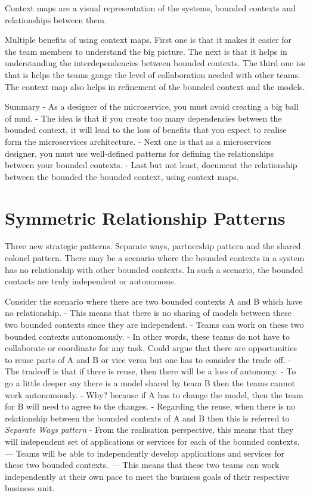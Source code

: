 Context maps are a visual representation of the systems, bounded contexts and relationships between them.

Multiple benefits of using context maps.
First one is that it makes it easier for the team members to understand the big picture.
The next is that it helps in understanding the interdependencies between bounded contexts.
The third one iss that is helps the teams gauge the level of collaboration needed with other teams.
The context map also helps in refinement of the bounded context and the models.

Summary
- As a designer of the microservice, you must avoid creating a big ball of mud.
- The idea is that if you create too many dependencies between the bounded context, it will lead to the loss of benefits that you expect to realise form the microservices architecture.
- Next one is that as a microservices designer, you must use well-defined patterns for defining the relationships between your bounded contexts.
- Last but not least, document the relationship between the bounded the bounded context, using context maps.

\section{Symmetric Relationship Patterns}

Three new strategic patterns.
Separate ways, partnership pattern and the shared colonel pattern.
There may be a scenario where the bounded contexts in a system has no relationship with other bounded contexts.
In such a scenario, the bounded contacts are truly independent or autonomous.

Consider the scenario where there are two bounded contexts A and B which have no relationship.
- This means that there is no sharing of models between these two bounded contexts since they are independent.
- Teams can work on these two bounded contexts autonomously.
- In other words, these teams do not have to collaborate or coordinate for any task.
Could argue that there are opportunities to reuse parts of A and B or vice versa but one has to consider the trade off.
- The tradeoff is that if there is reuse, then there will be a loss of autonomy.
- To go a little deeper say there is a model shared by team B then the teams cannot work autonomously.
- Why? because if A has to change the model, then the team for B will need to agree to the changes.
- Regarding the reuse, when there is no relationship between the bounded contexts of A and B then this is referred to \textit{Separate Ways pattern}
- From the realisation perspective, this means that they will independent set of applications or services for each of the bounded contexts.
--- Teams will be able to independently develop applications and services for these two bounded contexts.
--- This means that these two teams can work independently at their own pace to meet the business goals of their respective business unit.

